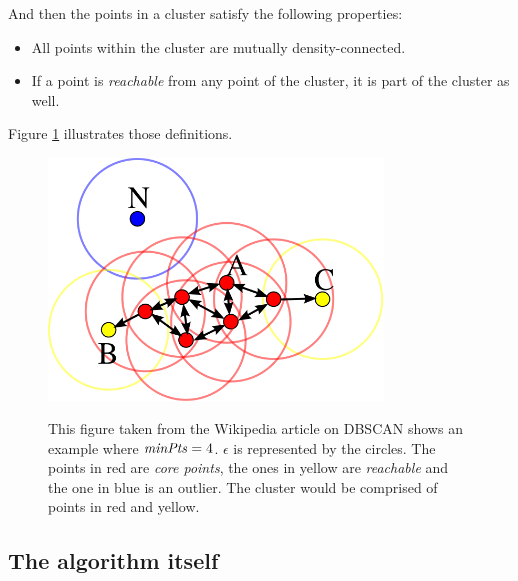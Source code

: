 And then the points in a cluster satisfy the following properties\cite{dbscan}:
\begin{itemize}
	\item All points within the cluster are mutually density-connected.
	\item If a point is \emph{reachable} from any point of the cluster, it is part of the cluster as well.
\end{itemize}

Figure \ref{fig:reachExample} illustrates those definitions.

\begin{figure}
\centering
{\includegraphics[width=3.5in]{images/reach_example.png}}
\caption{This figure taken from the Wikipedia article on DBSCAN \cite{dbscan} shows an example where $\mathit{minPts}=4$. $\epsilon$ is represented by the circles. The points in red are \emph{core points}, the ones in yellow are \emph{reachable} and the one in blue is an outlier. The cluster would be comprised of points in red and yellow.}
\label{fig:reachExample}
\end{figure}

\subsection{The algorithm itself}

